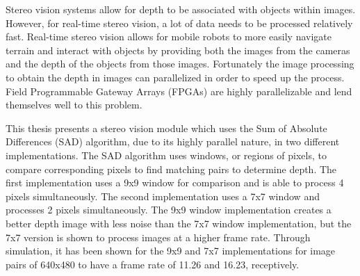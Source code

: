 Stereo vision systems allow for depth to be associated with objects within images. However, for real-time stereo vision, a lot of data needs to be processed relatively fast. Real-time stereo vision allows for mobile robots to more easily navigate terrain and interact with objects by providing both the images from the cameras and the depth of the objects from those images. Fortunately the image processing to obtain the depth in images can parallelized in order to speed up the process. Field Programmable Gateway Arrays (FPGAs) are highly parallelizable and lend themselves well to this problem.

This thesis presents a stereo vision module which uses the Sum of Absolute Differences (SAD) algorithm, due to its highly parallel nature, in two different implementations. The SAD algorithm uses windows, or regions of pixels, to compare corresponding pixels to find matching pairs to determine depth. The first implementation uses a 9x9 window for comparison and is able to process 4 pixels simultaneously. The second implementation uses a 7x7 window and processes 2 pixels simultaneously. The 9x9 window implementation creates a better depth image with less noise than the 7x7 window implementation, but the 7x7 version is shown to process images at a higher frame rate. Through simulation, it has been shown for the 9x9 and 7x7 implementations for image pairs of 640x480 to have a frame rate of 11.26 and 16.23, receptively.
